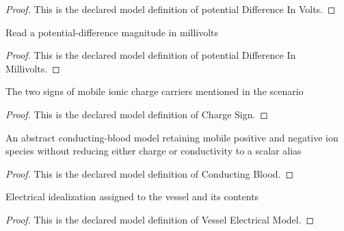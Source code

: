 \begin{proof}
  This is the declared model definition of potential Difference In Volts.
\end{proof}
\begin{definition}
  \label{def:physics:phyx-mini-0972:phyxminiproblems-problemphyxmini0972-potentialdifferenceinmillivolts}
  Read a potential-difference magnitude in millivolts
\end{definition}
\begin{proof}
  This is the declared model definition of potential Difference In Millivolts.
\end{proof}
\begin{definition}
  \label{def:physics:phyx-mini-0972:phyxminiproblems-problemphyxmini0972-chargesign}
  The two signs of mobile ionic charge carriers mentioned in the scenario
\end{definition}
\begin{proof}
  This is the declared model definition of Charge Sign.
\end{proof}
\begin{definition}
  \label{def:physics:phyx-mini-0972:phyxminiproblems-problemphyxmini0972-conductingblood}
  An abstract conducting-blood model retaining mobile positive and negative ion species without reducing either charge or conductivity to a scalar alias
\end{definition}
\begin{proof}
  This is the declared model definition of Conducting Blood.
\end{proof}
\begin{definition}
  \label{def:physics:phyx-mini-0972:phyxminiproblems-problemphyxmini0972-vesselelectricalmodel}
  Electrical idealization assigned to the vessel and its contents
\end{definition}
\begin{proof}
  This is the declared model definition of Vessel Electrical Model.
\end{proof}
